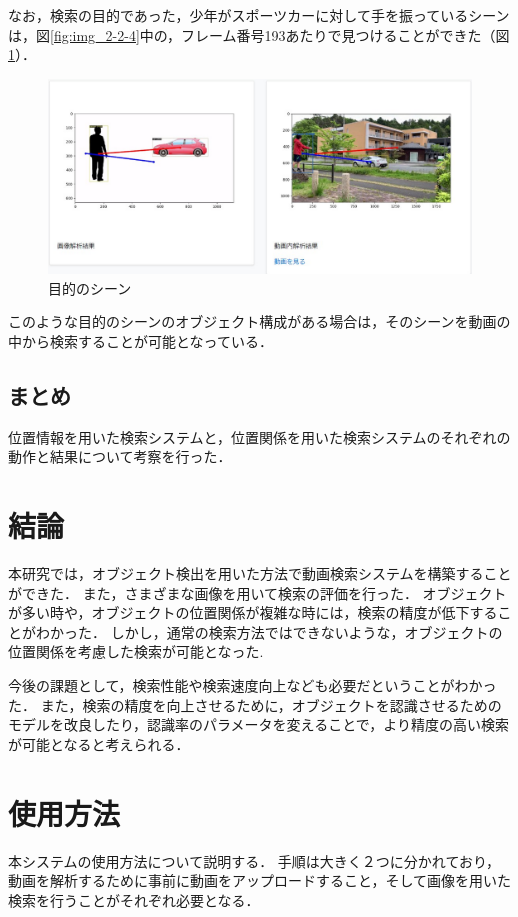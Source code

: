 \documentclass[a4j,12pt,dvipdfmx]{jreport}
\begin{document}
なお，検索の目的であった，少年がスポーツカーに対して手を振っているシーンは，図\ref{fig:img_2-2-4}中の，フレーム番号193あたりで見つけることができた（図\ref{fig:img_2-2-6}）．
\begin{figure}[b]
  \centering
  \includegraphics[width=13cm]{image/result_2_2_6.jpg}
  \caption{目的のシーン}
  \label{fig:img_2-2-6}
\end{figure}

このような目的のシーンのオブジェクト構成がある場合は，そのシーンを動画の中から検索することが可能となっている．


\section{まとめ}
位置情報を用いた検索システムと，位置関係を用いた検索システムのそれぞれの動作と結果について考察を行った．


\chapter{結論}
\label{sec:conclusion}
本研究では，オブジェクト検出を用いた方法で動画検索システムを構築することができた．
また，さまざまな画像を用いて検索の評価を行った．
オブジェクトが多い時や，オブジェクトの位置関係が複雑な時には，検索の精度が低下することがわかった．
しかし，通常の検索方法ではできないような，オブジェクトの位置関係を考慮した検索が可能となった.

今後の課題として，検索性能や検索速度向上なども必要だということがわかった．
また，検索の精度を向上させるために，オブジェクトを認識させるためのモデルを改良したり，認識率のパラメータを変えることで，より精度の高い検索が可能となると考えられる．

\clearpage


\chapter{使用方法}
\label{sec:usage}
本システムの使用方法について説明する．
手順は大きく２つに分かれており，動画を解析するために事前に動画をアップロードすること，そして画像を用いた検索を行うことがそれぞれ必要となる．
\end{document}
